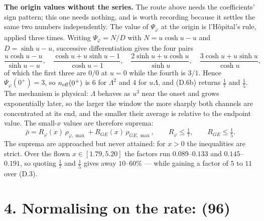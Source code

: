 \documentclass[11pt]{article}
\newcommand{\rbar}{\bar\rho}
\begin{document}
\textbf{The origin values without the series.} The route above needs
the coefficients' sign pattern; this one needs nothing, and is worth
recording because it settles the same two numbers independently. The
value of $\Psi_\varphi$ at the origin is l'H\^opital's rule, applied
three times. Writing $\Psi_\varphi = N/D$
with $N = u\cosh u - u$ and $D = \sinh u - u$, successive
differentiation gives the four pairs
\[
  \frac{u\cosh u - u}{\sinh u - u},\quad
  \frac{\cosh u + u\sinh u - 1}{\cosh u - 1},\quad
  \frac{2\sinh u + u\cosh u}{\sinh u},\quad
  \frac{3\cosh u + u\sinh u}{\cosh u},
\]
of which the first three are $0/0$ at $u = 0$ while the fourth is
$3/1$. Hence $\Psi_\varphi(0^+) = 3$, so $n_{\rm eff}(0^+)$ is $6$ for
$\Lambda^2$ and $4$ for $u\Lambda$, and (D.6b) returns $\tfrac17$ and
$\tfrac15$. The mechanism is physical: $\Lambda$ behaves as $u^3$ near the onset and
grows exponentially later, so the larger the window the more sharply
both channels are concentrated at its end, and the smaller their
average is relative to the endpoint value. The small-$x$ values are
therefore suprema:
\begin{equation}
  \rbar = R_\varphi(x)\,\rho_{\varphi,\max}
        + R_{GE}(x)\,\rho_{GE,\max},
  \qquad R_\varphi\le\tfrac17,\qquad R_{GE}\le\tfrac15 .
  \tag{95}
\end{equation}
The suprema are approached but never attained: for $x>0$ the
inequalities are strict. Over the flown $x\in[1.79,5.20]$ the factors
run $0.089$--$0.133$ and $0.145$--$0.191$, so quoting $\tfrac17$ and
$\tfrac15$ gives away $10$--$60\%$ --- while gaining a factor of $5$ to
$11$ over (D.3).

\section*{4. Normalising on the rate: (96)}
\end{document}
